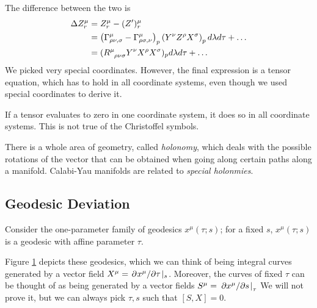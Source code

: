 The difference between the two is
\begin{align}
  \Delta Z^{\mu}_r &= Z^{\mu}_r - (Z')^{\mu}_r \\
		   &= \left( \Gamma^{\mu}_{\rho\nu, \sigma} - \Gamma^{\mu}_{\rho\sigma, \nu} \right)_p \left( Y^{\nu} Z^{\rho} X^{\sigma} \right)_p d\lambda d\tau + \dots \\
		   &= (R \indices{^{\mu}_{\rho\nu\sigma}} Y^{\nu}X^{\rho}X^{\sigma})_p d\lambda d\tau + \dots
\end{align}
We picked very special coordinates. However, the final expression is a tensor equation, which has to hold in all coordinate systems, even though we used special coordinates to derive it.
\begin{leftbar}
  \begin{remark}
    If a tensor evaluates to zero in one coordinate system, it does so in all coordinate systems. 
    This is not true of the Christoffel symbols.
  \end{remark}
\end{leftbar}
\begin{leftbar}
  \begin{remark}
    There is a whole area of geometry, called \emph{holonomy}, which deals with the possible rotations of the vector that can be obtained when going along certain paths along a manifold.
    Calabi-Yau manifolds are related to \emph{special holonmies}.
  \end{remark}
\end{leftbar}

\subsection{Geodesic Deviation}%
\label{sub:geodesic_deviation}

Consider the one-parameter family of geodesics $x^{\mu}(\tau; s)$; for a fixed $s$, $x^{\mu}(\tau;s)$ is a geodesic with affine parameter $\tau$.
\begin{figure}[tbhp]
  \centering
  \def\svgwidth{0.5\columnwidth}
  
  \caption{}
  \label{fig:l11f2}
\end{figure}
Figure \ref{fig:l11f2} depicts these geodesics, which we can think of being integral curves generated by a vector field $X^{\mu} = \flatfrac{\partial^{} x^{\mu}}{\partial \tau} \rvert_s$. Moreover, the curves of fixed $\tau$ can be thought of as being generated by a vector fields $S^{\mu} = \left.\pdv*{x^{\mu}}{s}\right\rvert_{\tau}$
We will not prove it, but we can always pick $\tau, s$ such that $[S, X] =0$.

